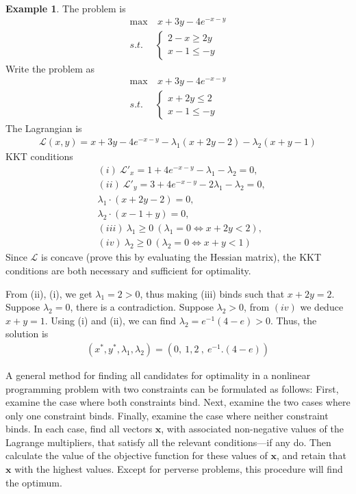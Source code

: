 \documentclass[10pt,a4paper]{book}
\theoremstyle{definition}\newtheorem{definition}{Definition}
\theoremstyle{definition}\newtheorem{fact}{Fact}
\theoremstyle{definition}\newtheorem{ex}{Ex.}
\theoremstyle{definition}\newtheorem{project}{Project}
\theoremstyle{definition}\newtheorem{problem}{Problem}
\theoremstyle{definition}\newtheorem{example}{Example}
\numberwithin{theorem}{chapter}
\numberwithin{corollary}{chapter}
\numberwithin{assumption}{chapter}
\numberwithin{definition}{chapter}
\numberwithin{prop}{chapter}
\numberwithin{notation}{chapter}
\numberwithin{problem}{chapter}
\numberwithin{example}{chapter}
\numberwithin{fact}{chapter}
\numberwithin{ex}{chapter}
\def\x{\mathbf x}
\begin{document}
	\begin{example}
		The problem is
		\begin{align*}
			\max & \ x + 3y - 4 e^{-x-y} \\
			s.t. & \begin{cases}         
				2 - x \geq 2y \\
				x-1 \leq -y
			\end{cases}
		\end{align*}
		Write the problem as
		\begin{align*}
			\max & \ x + 3y - 4 e^{-x-y} \\
			s.t. & \begin{cases}         
				x + 2y \leq 2 \\
				x-1 \leq -y
			\end{cases}
		\end{align*}
		The Lagrangian is
		\begin{align*}
			\mathcal{L}(x,y) = x + 3y - 4 e^{-x-y} - \lambda_1 (x + 2y - 2) - \lambda_2 (x+y-1) 
		\end{align*}
		KKT conditions
		\begin{align*}
			& (i) \ \mathcal{L}'_x = 1 + 4e^{-x-y} - \lambda_1 - \lambda_2 = 0,   \\
			& (ii) \ \mathcal{L}'_y = 3 + 4e^{-x-y} - 2\lambda_1 - \lambda_2 = 0, \\
			&   \lambda_1 \cdot (x+2y-2) = 0, \\
			& \lambda_2 \cdot (x-1+y) = 0, \\
			& (iii) \ \lambda_1 \geq 0 \ (\lambda_1 = 0 \iff x + 2y < 2),         \\
			& (iv) \ \lambda_2 \geq 0 \ (\lambda_2 = 0 \iff x + y < 1)            
		\end{align*}
		Since $\mathcal{L}$ is concave (prove this by evaluating the Hessian matrix), the KKT conditions are both necessary and sufficient for optimality.
		
		From (ii), (i), we get $\lambda_1 = 2 > 0$, thus making (iii) binds such that $x+2y=2$. Suppose $\lambda_2=0$, there is a contradiction. Suppose $\lambda_2 > 0$, from $(iv)$ we deduce $x+y=1$. Using (i) and (ii), we can find $\lambda_2 = e^{-1} (4-e) > 0$. Thus, the solution is
		\begin{align*}
			(x^*, y^*, \lambda_1, \lambda_2) = (0, \ 1, 2\ , \ e^{-1}. (4-e)) 
		\end{align*}
	\end{example}
	
	A general method for finding all candidates for optimality in a nonlinear programming problem with two constraints can be formulated as follows: First, examine the case where both constraints bind. Next, examine the two cases where only one constraint binds. Finally, examine the case where neither constraint binds. In each case, find all vectors $\x$, with associated non-negative values of the Lagrange multipliers, that satisfy all the relevant conditions—if any do. Then calculate the value of the objective function for these values of $\x$, and retain that $\x$ with the highest values. Except for perverse problems, this procedure will find the optimum. 
	
\end{document}
